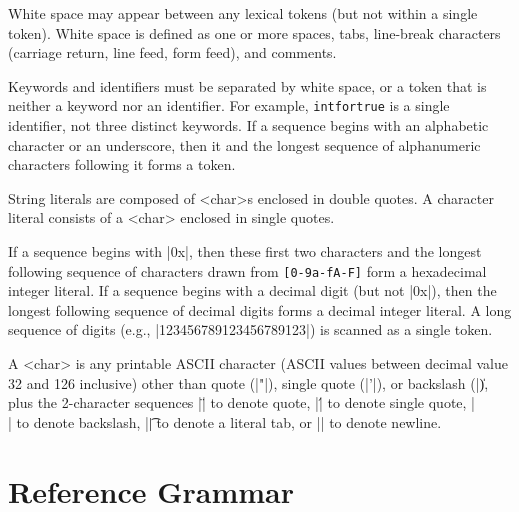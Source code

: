 \documentclass[11pt]{article}
\begin{document}
White space may appear between any lexical tokens (but not within a single token).
White space is defined as one or more spaces, tabs, line-break characters (carriage return, line feed, form feed), and comments.

Keywords and identifiers must be separated by white space, or a token that is neither a keyword nor an identifier.
For example, {\tt intfortrue} is a single identifier, not three distinct keywords.
If a sequence begins with an alphabetic character or an underscore, then it and the longest sequence of alphanumeric characters following it forms a token.

String literals are composed of {\bnf <char>}s enclosed in double quotes.
A character literal consists of a {\bnf <char>} enclosed in single quotes.

If a sequence begins with \decaf|0x|, then these first two characters and the longest following sequence of characters drawn from {\tt [0-9a-fA-F]} form a hexadecimal integer literal.
If a sequence begins with a decimal digit (but not \decaf|0x|), then the longest following sequence of decimal digits forms a decimal integer literal.
A long sequence of digits (e.g., \decaf|123456789123456789123|) is scanned as a single token.


A {\bnf <char>} is any printable ASCII character (ASCII values between decimal value 32 and 126 inclusive) other than quote (\decaf|"|), single quote (\decaf|'|), or backslash (\decaf|\|), plus the 2-character sequences \decaf|\"| to denote quote, \decaf|\'| to denote single quote, \decaf|\\| to denote backslash, \decaf|\t| to denote a literal tab, or \decaf|\n| to denote newline.

\section{Reference Grammar}
\end{document}
